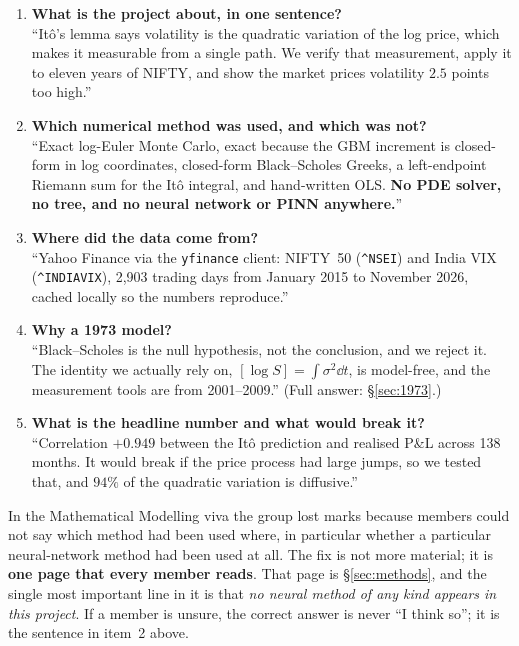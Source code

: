 \documentclass[11pt,a4paper]{article}
\begin{document}
\begin{keybox}
\begin{enumerate}[leftmargin=*,topsep=1pt,itemsep=3pt]
\item \textbf{What is the project about, in one sentence?}\\
      ``It\^o's lemma says volatility is the quadratic variation of the log price, which makes
      it measurable from a single path. We verify that measurement, apply it to eleven years of
      NIFTY, and show the market prices volatility $2.5$ points too high.''
\item \textbf{Which numerical method was used, and which was not?}\\
      ``Exact log-Euler Monte Carlo, exact because the GBM increment is closed-form in log
      coordinates, closed-form Black--Scholes Greeks, a left-endpoint Riemann sum for the
      It\^o integral, and hand-written OLS. \textbf{No PDE solver, no tree, and no neural
      network or PINN anywhere.}''
\item \textbf{Where did the data come from?}\\
      ``Yahoo Finance via the \texttt{yfinance} client: NIFTY~50 (\texttt{\^{}NSEI}) and India
      VIX (\texttt{\^{}INDIAVIX}), 2{,}903 trading days from January 2015 to November 2026,
      cached locally so the numbers reproduce.''
\item \textbf{Why a 1973 model?}\\
      ``Black--Scholes is the null hypothesis, not the conclusion, and we reject it. The
      identity we actually rely on, $[\log S]=\int\sigma^2\dd t$, is model-free, and the
      measurement tools are from 2001--2009.'' (Full answer: \S\ref{sec:1973}.)
\item \textbf{What is the headline number and what would break it?}\\
      ``Correlation $+0.949$ between the It\^o prediction and realised P\&L across 138 months.
      It would break if the price process had large jumps, so we tested that, and $94\%$ of
      the quadratic variation is diffusive.''
\end{enumerate}
\end{keybox}

\begin{trapbox}
In the Mathematical Modelling viva the group lost marks because members could not say which
method had been used where, in particular whether a particular neural-network method had
been used at all. The fix is not more material; it is \textbf{one page that every member reads}.
That page is \S\ref{sec:methods}, and the single most important line in it is that
\emph{no neural method of any kind appears in this project}. If a member is unsure, the correct
answer is never ``I think so''; it is the sentence in item~2 above.
\end{trapbox}
\end{document}
